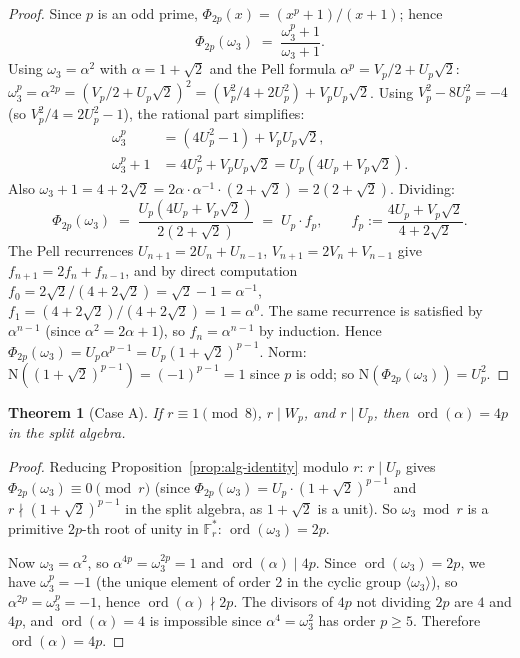 \documentclass[11pt]{amsart}
\theoremstyle{plain}
\newtheorem{theorem}{Theorem}[section]
\theoremstyle{definition}
\theoremstyle{remark}
\numberwithin{equation}{section}
\newcommand{\ord}{\operatorname{ord}}
\newcommand{\F}{\mathbb{F}}
\begin{document}
\begin{proof}
Since $p$ is an odd prime, $\Phi_{2p}(x) = (x^p + 1)/(x + 1)$; hence
\[
  \Phi_{2p}(\omega_3) \;=\; \frac{\omega_3^p + 1}{\omega_3 + 1}.
\]
Using $\omega_3 = \alpha^2$ with $\alpha = 1 + \sqrt 2$ and the Pell formula $\alpha^p = V_p/2 + U_p \sqrt 2$: $\omega_3^p = \alpha^{2p} = (V_p/2 + U_p \sqrt 2)^2 = (V_p^2/4 + 2 U_p^2) + V_p U_p \sqrt 2$. Using $V_p^2 - 8 U_p^2 = -4$ (so $V_p^2/4 = 2 U_p^2 - 1$), the rational part simplifies:
\[
  \begin{aligned}
  \omega_3^p &= (4 U_p^2 - 1) + V_p U_p \sqrt 2,\\
  \omega_3^p + 1 &= 4 U_p^2 + V_p U_p \sqrt 2
                 = U_p (4 U_p + V_p \sqrt 2).
  \end{aligned}
\]
Also $\omega_3 + 1 = 4 + 2\sqrt 2 = 2 \alpha \cdot \alpha^{-1} \cdot (2 + \sqrt 2) = 2 (2 + \sqrt 2)$. Dividing:
\[
  \Phi_{2p}(\omega_3) \;=\; \frac{U_p (4 U_p + V_p \sqrt 2)}{2(2 + \sqrt 2)} \;=\; U_p \cdot f_p, \qquad f_p := \frac{4 U_p + V_p \sqrt 2}{4 + 2 \sqrt 2}.
\]
The Pell recurrences $U_{n+1} = 2 U_n + U_{n-1}$, $V_{n+1} = 2 V_n + V_{n-1}$ give $f_{n+1} = 2 f_n + f_{n-1}$, and by direct computation $f_0 = 2\sqrt 2/(4 + 2\sqrt 2) = \sqrt 2 - 1 = \alpha^{-1}$, $f_1 = (4 + 2\sqrt 2)/(4 + 2\sqrt 2) = 1 = \alpha^0$. The same recurrence is satisfied by $\alpha^{n-1}$ (since $\alpha^2 = 2\alpha + 1$), so $f_n = \alpha^{n-1}$ by induction. Hence $\Phi_{2p}(\omega_3) = U_p \alpha^{p-1} = U_p (1+\sqrt 2)^{p-1}$. Norm: $\mathrm{N}((1+\sqrt 2)^{p-1}) = (-1)^{p-1} = 1$ since $p$ is odd; so $\mathrm{N}(\Phi_{2p}(\omega_3)) = U_p^2$.
\end{proof}

\begin{theorem}[Case A]\label{thm:caseA}
If $r \equiv 1 \pmod 8$, $r \mid W_p$, and $r \mid U_p$, then $\ord(\alpha) = 4p$ in the split algebra.
\end{theorem}

\begin{proof}
Reducing Proposition~\ref{prop:alg-identity} modulo $r$: $r \mid U_p$ gives $\Phi_{2p}(\omega_3) \equiv 0 \pmod r$ (since $\Phi_{2p}(\omega_3) = U_p \cdot (1 + \sqrt 2)^{p-1}$ and $r \nmid (1 + \sqrt 2)^{p-1}$ in the split algebra, as $1 + \sqrt 2$ is a unit). So $\omega_3 \bmod r$ is a primitive $2p$-th root of unity in $\F_r^\ast$: $\ord(\omega_3) = 2 p$.

Now $\omega_3 = \alpha^2$, so $\alpha^{4p} = \omega_3^{2p} = 1$ and $\ord(\alpha) \mid 4p$. Since $\ord(\omega_3) = 2p$, we have $\omega_3^p = -1$ (the unique element of order 2 in the cyclic group $\langle\omega_3\rangle$), so $\alpha^{2p} = \omega_3^p = -1$, hence $\ord(\alpha) \nmid 2p$. The divisors of $4p$ not dividing $2p$ are $4$ and $4p$, and $\ord(\alpha) = 4$ is impossible since $\alpha^4 = \omega_3^2$ has order $p \geq 5$. Therefore $\ord(\alpha) = 4p$.
\end{proof}
\end{document}
